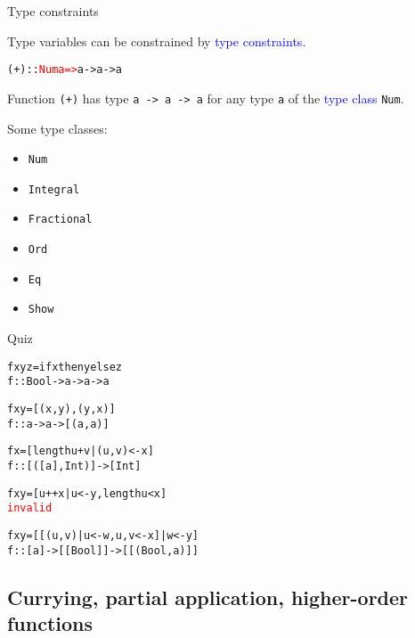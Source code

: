 \documentclass{beamer}
\def\code#1{\texttt{\frenchspacing#1}}
\begin{document}
\begin{frame}[fragile]{Type constraints}

Type variables can be constrained by \textcolor{blue}{type constraints}.

\begin{alltt}
(+) :: \textcolor{red}{Num a =>} a -> a -> a
\end{alltt}

Function \code{(+)} has type \code{a -> a -> a} for any type \code{a} of the \textcolor{blue}{type class} \code{Num}.

\pause

\vspace{1cm}
\begin{exampleblock}{Some type classes:}\pause
\begin{itemize}
    \item \code{Num}\pause
    \item \code{Integral}\pause
    \item \code{Fractional}\pause
    \item \code{Ord}\pause
    \item \code{Eq}\pause
    \item \code{Show}
\end{itemize}
\end{exampleblock}

\end{frame}

\begin{frame}[fragile]{Quiz}

\begin{alltt}
f x y z = if x then y else z\pause
f :: Bool -> a -> a -> a

f x y = [(x,y), (y,x)]\pause
f :: a -> a -> [(a,a)]

f x = [length u + v | (u,v) <- x ]\pause
f :: [([a],Int)] -> [Int]

f x y = [u ++ x | u <- y, length u < x ]\pause
\textcolor{red}{invalid}

f x y = [[(u,v) | u <- w, u, v <- x] | w <- y]\pause
f :: [a] -> [[Bool]] -> [[(Bool, a)]]
\end{alltt}

\end{frame}

\subsection{Currying, partial application, higher-order functions}
\end{document}
